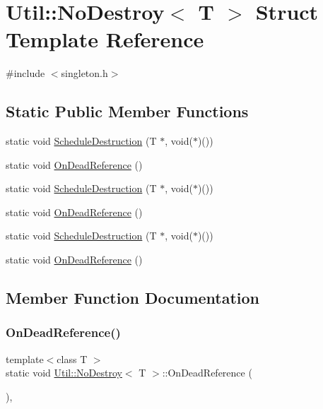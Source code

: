 \hypertarget{structUtil_1_1NoDestroy}{}\section{Util\+:\+:No\+Destroy$<$ T $>$ Struct Template Reference}
\label{structUtil_1_1NoDestroy}


{\ttfamily \#include $<$singleton.\+h$>$}

\subsection*{Static Public Member Functions}
\begin{DoxyCompactItemize}
\item 
static void \mbox{\hyperlink{structUtil_1_1NoDestroy_ae6d5e0f02676f06596f1280f22c9393d}{Schedule\+Destruction}} (T $\ast$, void($\ast$)())
\item 
static void \mbox{\hyperlink{structUtil_1_1NoDestroy_a558d463fad4c69bdc42ce55d7f5ebff5}{On\+Dead\+Reference}} ()
\item 
static void \mbox{\hyperlink{structUtil_1_1NoDestroy_ae6d5e0f02676f06596f1280f22c9393d}{Schedule\+Destruction}} (T $\ast$, void($\ast$)())
\item 
static void \mbox{\hyperlink{structUtil_1_1NoDestroy_a558d463fad4c69bdc42ce55d7f5ebff5}{On\+Dead\+Reference}} ()
\item 
static void \mbox{\hyperlink{structUtil_1_1NoDestroy_ae6d5e0f02676f06596f1280f22c9393d}{Schedule\+Destruction}} (T $\ast$, void($\ast$)())
\item 
static void \mbox{\hyperlink{structUtil_1_1NoDestroy_a558d463fad4c69bdc42ce55d7f5ebff5}{On\+Dead\+Reference}} ()
\end{DoxyCompactItemize}


\subsection{Member Function Documentation}
\mbox{\label{structUtil_1_1NoDestroy_a558d463fad4c69bdc42ce55d7f5ebff5}} 
\subsubsection{\texorpdfstring{OnDeadReference()}{OnDeadReference()}\hspace{0.1cm}{\footnotesize\ttfamily [1/3]}}
{\footnotesize\ttfamily template$<$class T $>$ \\
static void \mbox{\hyperlink{structUtil_1_1NoDestroy}{Util\+::\+No\+Destroy}}$<$ T $>$\+::On\+Dead\+Reference (\begin{DoxyParamCaption}{ }\end{DoxyParamCaption})\hspace{0.3cm}{\ttfamily [inline]}, {\ttfamily [static]}}

